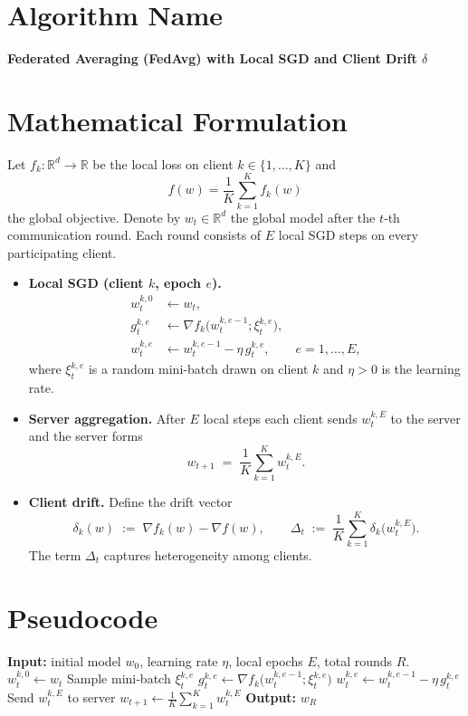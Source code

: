 \documentclass{article}
\newcommand{\RR}{\mathbb{R}}
\begin{document}
\section*{Algorithm Name}
\textbf{Federated Averaging (FedAvg) with Local SGD and Client Drift $\delta$}

\section*{Mathematical Formulation}
Let $f_k:\RR^d\rightarrow\RR$ be the local loss on client $k\in\{1,\dots ,K\}$ and 
\[
f(w)=\frac1K\sum_{k=1}^{K}f_k(w)
\]
the global objective.  
Denote by $w_t\in\RR^d$ the global model after the $t$‑th communication round.  
Each round consists of $E$ local SGD steps on every participating client.

\begin{itemize}
\item \textbf{Local SGD (client $k$, epoch $e$).}
\[
\begin{aligned}
w_{t}^{k,0} &\gets w_t,\\
g_{t}^{k,e} &\gets \nabla f_k\!\bigl(w_{t}^{k,e-1};\xi_{t}^{k,e}\bigr),\\
w_{t}^{k,e} &\gets w_{t}^{k,e-1}-\eta\, g_{t}^{k,e},
\qquad e=1,\dots ,E,
\end{aligned}
\]
where $\xi_{t}^{k,e}$ is a random mini‑batch drawn on client $k$ and $\eta>0$ is the learning rate.

\item \textbf{Server aggregation.}
After $E$ local steps each client sends $w_{t}^{k,E}$ to the server and the server forms
\[
w_{t+1}\;=\;\frac1K\sum_{k=1}^{K} w_{t}^{k,E}.
\]

\item \textbf{Client drift.}
Define the drift vector
\[
\delta_k(w)\;:=\;\nabla f_k(w)-\nabla f(w),
\qquad 
\Delta_t\;:=\;\frac1K\sum_{k=1}^{K}\delta_k\bigl(w_{t}^{k,E}\bigr).
\]
The term $\Delta_t$ captures heterogeneity among clients.
\end{itemize}

\section*{Pseudocode}
\begin{algorithm}[H]
\caption{FedAvg with $K$ clients, $E$ local epochs}
\label{alg:fedavg}
\begin{algorithmic}[1]
\STATE \textbf{Input:} initial model $w_0$, learning rate $\eta$, local epochs $E$, total rounds $R$.
        \STATE $w_{t}^{k,0}\gets w_t$
            \STATE Sample mini‑batch $\xi_{t}^{k,e}$
            \STATE $g_{t}^{k,e}\gets \nabla f_k\!\bigl(w_{t}^{k,e-1};\xi_{t}^{k,e}\bigr)$
            \STATE $w_{t}^{k,e}\gets w_{t}^{k,e-1}-\eta\, g_{t}^{k,e}$
        \ENDFOR
        \STATE Send $w_{t}^{k,E}$ to server
    \ENDFOR
    \STATE $w_{t+1}\gets \frac1K\sum_{k=1}^{K} w_{t}^{k,E}$
\ENDFOR
\STATE \textbf{Output:} $w_R$
\end{algorithmic}
\end{algorithm}
\end{document}
